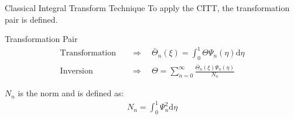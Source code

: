 \documentclass[english,landscape,xcolor=dvipsnames,aspectratio=169]{beamer}
\newcommand{\dd}{\mathrm{d}}
\begin{document}
	
	
	
	
	
	
	
\begin{frame}{Classical Integral Transform Technique}
To apply the CITT, the transformation pair is defined.
\begin{varblock}[10cm]{Transformation Pair}
\begin{align*}
\text{Transformation} \quad &\Rightarrow \quad 
\bar{\Theta}_n(\xi)=\int_{0}^{1}\Theta\Psi_n(\eta)\dd\eta\\
\text{Inversion} \quad & \Rightarrow \quad \Theta= \sum_{n=0}^{\infty} \frac{ \bar{\Theta}_n(\xi)\Psi_n(\eta)}{N_n} 
\end{align*}
\vspace{0em}
\end{varblock}
$N_n$ is the norm and is defined as:
%
\begin{gather*}
N_n=\int_{0}^{1}\Psi_n^2 \dd \eta  
\end{gather*}
\end{frame}




	
	
\end{document}
